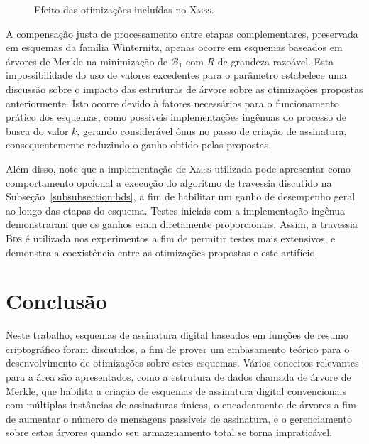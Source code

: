 \documentclass{ufsctex/ufsctex}
\newcommand{\bone}{\mathcal{B}_{1}}
\newcommand{\bds}{\textsc{Bds}}
\newcommand{\xmss}{\textsc{Xmss}}
\begin{document}
\begin{figure}
  \caption{Efeito das otimizações incluídas no
    \xmss{}.}\label{fig:xmssresults}
\end{figure}

A compensação justa de processamento entre etapas complementares, preservada em
esquemas da família Winternitz, apenas ocorre em esquemas baseados em árvores
de Merkle na minimização de $\bone{}$ com $R$ de grandeza razoável. Esta
impossibilidade do uso de valores excedentes para o parâmetro estabelece uma
discussão sobre o impacto das estruturas de árvore sobre as otimizações
propostas anteriormente. Isto ocorre devido à fatores necessários para o
funcionamento prático dos esquemas, como possíveis implementações ingênuas do
processo de busca do valor $k$, gerando considerável ônus no passo de criação
de assinatura, consequentemente reduzindo o ganho obtido pelas propostas.

Além disso, note que a implementação de \xmss{} utilizada pode apresentar como
comportamento opcional a execução do algoritmo de travessia discutido na
Subseção~\ref{subsubsection:bds}, a fim de habilitar um ganho de desempenho
geral ao longo das etapas do esquema. Testes iniciais com a implementação
ingênua demonstraram que os ganhos eram diretamente proporcionais. Assim, a
travessia \bds{} é utilizada nos experimentos a fim de permitir testes mais
extensivos, e demonstra a coexistência entre as otimizações propostas e este
artifício.

\chapter{Conclusão}\label{chapter:conclusion}

Neste trabalho, esquemas de assinatura digital baseados em funções de resumo
criptográfico foram discutidos, a fim de prover um embasamento teórico para o
desenvolvimento de otimizações sobre estes esquemas. Vários conceitos
relevantes para a área são apresentados, como a estrutura de dados chamada de
árvore de Merkle, que habilita a criação de esquemas de assinatura digital
convencionais com múltiplas instâncias de assinaturas únicas, o encadeamento de
árvores a fim de aumentar o número de mensagens passíveis de assinatura, e o
gerenciamento sobre estas árvores quando seu armazenamento total se torna
impraticável.
\end{document}

